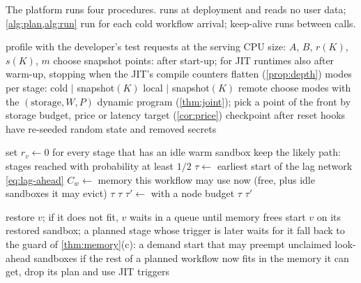 The platform runs four procedures.  runs at deployment and reads no user data;
\cref{alg:plan,alg:run} run for each cold workflow arrival; keep-alive runs between calls.

\begin{algorithm}[t]
\caption{\textsc{Build} (per function, at each deployment).}
\label{alg:build}
\begin{algorithmic}[1]
\State profile with the developer's test requests at the serving CPU size: $A$, $B$, $r(K)$,
  $s(K)$, $m$
\State choose snapshot points: after start-up; for JIT runtimes also after warm-up, stopping
  when the JIT's compile counters flatten (\cref{prop:depth})
\State modes per stage: cold $\mid$ snapshot$(K)$ local $\mid$ snapshot$(K)$ remote
\State choose modes with the $(\text{storage}, W, P)$ dynamic program (\cref{thm:joint}); pick a
  point of the front by storage budget, price or latency target (\cref{cor:price})
\State checkpoint after reset hooks have re-seeded random state and removed secrets
\end{algorithmic}
\end{algorithm}

\begin{algorithm}[t]
\caption{\textsc{Plan} (per cold workflow arrival).}
\label{alg:plan}
\begin{algorithmic}[1]
\State set $r_v \gets 0$ for every stage that has an idle warm sandbox
\State keep the likely path: stages reached with probability at least $1/2$
\State $\tau \gets$ earliest start of the lag network \eqref{eq:lag-ahead}
\State $C_w \gets$ memory this workflow may use now (free, plus idle sandboxes it may evict)
 \Return $\tau$ 
\EndIf
{} \Return $\tau$
\EndIf
\State $\tau' \gets$  with a node budget 
 \Return $\tau$
\EndIf
\State \Return $\tau'$
\end{algorithmic}
\end{algorithm}

\begin{algorithm}[t]
\caption{\textsc{Run} (event-driven, shared by all workflows on a machine).}
\label{alg:run}
\begin{algorithmic}[1]
  \State restore $v$; if it does not fit, $v$ waits in a queue until memory frees
\EndOn
{}
  \State start $v$ on its restored sandbox; a planned stage whose trigger is later waits for it
\EndOn
{}
  \State fall back to the guard of \cref{thm:memory}(c): a demand start that may preempt
    unclaimed look-ahead sandboxes
\EndOn
{}
  \State if the rest of a planned workflow now fits in the memory it can get, drop its plan and
    use JIT triggers
\EndOn
\end{algorithmic}
\end{algorithm}

